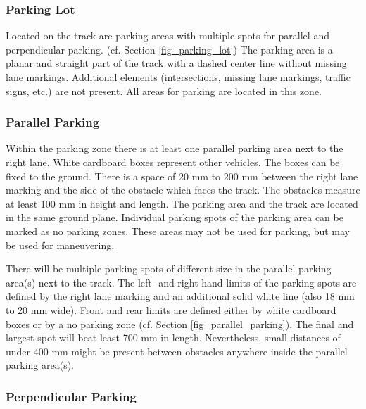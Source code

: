\begin{highlight}
	\subsubsection{Parking Lot}

	Located on the track are parking areas with multiple spots for parallel and
	perpendicular parking.  (cf. Section \ref{fig_parking_lot}) The parking
	area is a planar and straight part of the track with a dashed center line
	without missing lane markings. Additional elements (intersections, missing lane
	markings, traffic signs, etc.) are not present. All areas for parking are
	located in this zone.

	\subsubsection{Parallel Parking}

	Within the parking zone there is at least one parallel parking area next to the
	right lane. White cardboard boxes represent other vehicles. The boxes can be
	fixed to the ground. There is a space of 20 mm to 200 mm between the right lane
	marking and the side of the obstacle which faces the track. The obstacles
	measure at least 100 mm in height and length. The parking area and the track
	are located in the same ground plane. Individual parking spots of the parking
	area can be marked as no parking zones. These areas may not be used for
	parking, but may be used for maneuvering.

	There will be multiple parking spots of different size in the parallel parking
	area(s) next to the track. The left- and right-hand limits of the parking spots
	are defined by the right lane marking and an additional solid white line (also
	18 mm to 20 mm wide). Front and rear limits are defined either by white
	cardboard boxes or by a no parking zone (cf. Section
	\ref{fig_parallel_parking}).  The final and largest spot will
	beat least 700 mm in length. Nevertheless, small distances of under 400 mm
	might be present between obstacles anywhere inside the parallel parking
	area(s).

	\subsubsection{Perpendicular Parking}


\end{highlight}
